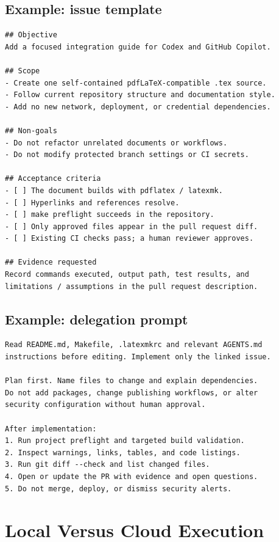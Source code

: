\documentclass[11pt,letterpaper,oneside]{article}
\begin{document}
\subsection{Example: issue template}
\begin{lstlisting}[style=mdstyle,caption={Recommended GitHub issue body; replace paths and checks.}]
## Objective
Add a focused integration guide for Codex and GitHub Copilot.

## Scope
- Create one self-contained pdfLaTeX-compatible .tex source.
- Follow current repository structure and documentation style.
- Add no new network, deployment, or credential dependencies.

## Non-goals
- Do not refactor unrelated documents or workflows.
- Do not modify protected branch settings or CI secrets.

## Acceptance criteria
- [ ] The document builds with pdflatex / latexmk.
- [ ] Hyperlinks and references resolve.
- [ ] make preflight succeeds in the repository.
- [ ] Only approved files appear in the pull request diff.
- [ ] Existing CI checks pass; a human reviewer approves.

## Evidence requested
Record commands executed, output path, test results, and
limitations / assumptions in the pull request description.
\end{lstlisting}

\subsection{Example: delegation prompt}
\begin{lstlisting}[style=mdstyle,caption={Bounded delegation with reviewable deliverables.}]
Read README.md, Makefile, .latexmkrc and relevant AGENTS.md
instructions before editing. Implement only the linked issue.

Plan first. Name files to change and explain dependencies.
Do not add packages, change publishing workflows, or alter
security configuration without human approval.

After implementation:
1. Run project preflight and targeted build validation.
2. Inspect warnings, links, tables, and code listings.
3. Run git diff --check and list changed files.
4. Open or update the PR with evidence and open questions.
5. Do not merge, deploy, or dismiss security alerts.
\end{lstlisting}

\section{Local Versus Cloud Execution}
\end{document}
